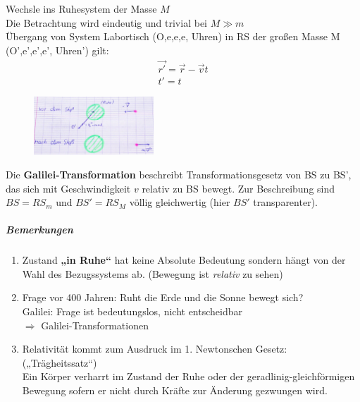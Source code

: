 Wechsle ins Ruhesystem der Masse $M$\\
Die Betrachtung wird eindeutig und trivial bei $M\gg m$\\
Übergang von System Labortisch (O,e,e,e, Uhren) in RS der großen Masse M (O',e',e',e', Uhren') gilt:
\begin{align*}
\vec{r'}=\vec{r}-\vec{v}t\\
t'=t
\end{align*}
\begin{figure}[h]
\begin{center}
\includegraphics[width=0.4\textwidth]{Skizzen/Anhang5.jpg}
\end{center}
\caption{}
\end{figure}

Die \textbf{Galilei-Transformation} beschreibt Transformationsgesetz von BS zu BS', das sich mit Geschwindigkeit $v$ relativ zu BS bewegt. Zur Beschreibung sind $BS=RS_m$ und $BS'=RS_M$ völlig gleichwertig (hier $BS'$ transparenter).\\
\subparagraph*{Bemerkungen}
\begin{enumerate}
\item Zustand \textbf{„in Ruhe“} hat keine Absolute Bedeutung sondern
  hängt von der Wahl des Bezugssystems ab. (Bewegung ist
  \emph{relativ} zu sehen)
\item Frage vor 400 Jahren: Ruht die Erde und die Sonne bewegt sich?\\
  Galilei: Frage ist bedeutungslos, nicht entscheidbar\\
  $\Rightarrow$ Galilei-Transformationen
\item Relativität kommt zum Ausdruck im 1. Newtonschen Gesetz:(„Trägheitssatz“)\\
Ein Körper verharrt im Zustand der Ruhe oder der geradlinig-gleichförmigen Bewegung sofern er nicht durch Kräfte zur Änderung gezwungen wird.
\end{enumerate}

